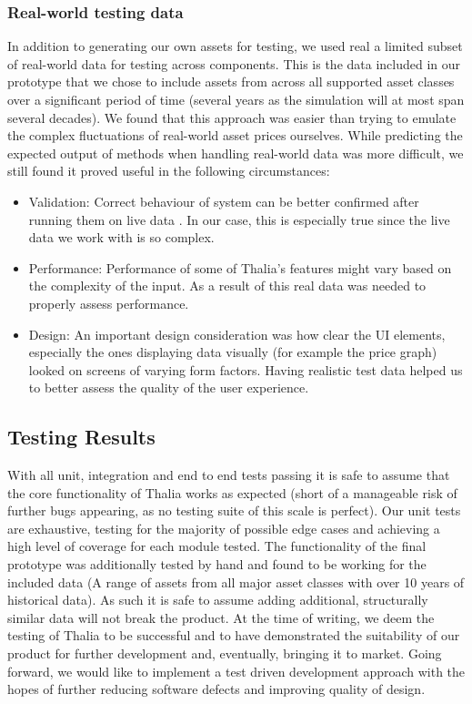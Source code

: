 \documentclass[main.tex]{subfiles}
\begin{document}
\subsubsection{Real-world testing data}

In addition to generating our own assets for testing, we used real a limited subset of real-world data for testing across components. This is the data included in our prototype that we chose to include assets from across all supported asset classes over a significant period of time (several years as the simulation will at most span several decades). We found that this approach was easier than trying to emulate the complex fluctuations of real-world asset prices ourselves. While predicting the expected output of methods when handling real-world data was more difficult, we still found it proved useful in the following circumstances: 

\begin{itemize}

\item Validation:
Correct behaviour of system can be better confirmed after running them on live data \cite{liveData}. In our case, this is especially true since the live data we work with is so complex.

\item Performance:
Performance of some of Thalia's features might vary based on the complexity of the input. As a result of this real data was needed to properly assess performance.

\item Design:
An important design consideration was how clear the UI elements, especially the ones displaying data visually (for example the price graph) looked on screens of varying form factors. Having realistic test data helped us to better assess the quality of the user experience.

\end{itemize}
 

\subsection{Testing Results}

With all unit, integration and end to end tests passing it is safe to assume that the core functionality of Thalia works as expected (short of a manageable risk of further bugs appearing, as no testing suite of this scale is perfect). Our unit tests are exhaustive, testing for the majority of possible edge cases and achieving a high level of coverage for each module tested. The functionality of the final prototype was additionally tested by hand and found to be working for the included data (A range of assets from all major asset classes with over 10 years of historical data). As such it is safe to assume adding additional, structurally similar data will not break the product.
At the time of writing, we deem the testing of Thalia to be successful and to have demonstrated the suitability of our product for further development and, eventually, bringing it to market. Going forward, we would like to implement a test driven development approach with the hopes of further reducing software defects and  improving quality of design\cite{TDD}.
\end{document}
